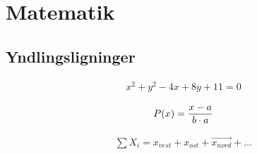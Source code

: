 \chapter{Matematik}
\section{Yndlingsligninger}
\begin{align}
x^2+y^2-4x+8y+11=0
\label{eq:ligning1}
\end{align}

\begin{align}
P(x)=\frac{x-a}{b \cdot a}
\end{align}

\begin{align}
\sum X_i = x_{vest} + x_{\textit{ø}st}+\overrightarrow{x_{nord}}+\ldots
\end{align}
